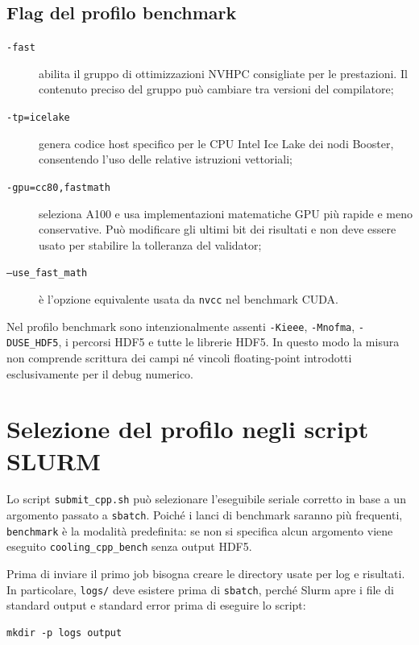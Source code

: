 \documentclass[11pt,a4paper]{article}
\begin{document}
\subsection{Flag del profilo benchmark}

\begin{description}
  \item[\texttt{-fast}] abilita il gruppo di ottimizzazioni NVHPC consigliate
  per le prestazioni. Il contenuto preciso del gruppo può cambiare tra versioni
  del compilatore;
  \item[\texttt{-tp=icelake}] genera codice host specifico per le CPU Intel Ice
  Lake dei nodi Booster, consentendo l'uso delle relative istruzioni vettoriali;
  \item[\texttt{-gpu=cc80,fastmath}] seleziona A100 e usa implementazioni
  matematiche GPU più rapide e meno conservative. Può modificare gli ultimi bit
  dei risultati e non deve essere usato per stabilire la tolleranza del
  validator;
  \item[\texttt{--use\_fast\_math}] è l'opzione equivalente usata da
  \texttt{nvcc} nel benchmark CUDA.
\end{description}

Nel profilo benchmark sono intenzionalmente assenti \texttt{-Kieee},
\texttt{-Mnofma}, \texttt{-DUSE\_HDF5}, i percorsi HDF5 e tutte le librerie
HDF5. In questo modo la misura non comprende scrittura dei campi né vincoli
floating-point introdotti esclusivamente per il debug numerico.


\section{Selezione del profilo negli script SLURM}

Lo script \texttt{submit\_cpp.sh} può selezionare l'eseguibile seriale corretto
in base a un argomento passato a \texttt{sbatch}. Poiché i lanci di benchmark
saranno più frequenti, \texttt{benchmark} è la modalità predefinita: se non si
specifica alcun argomento viene eseguito \texttt{cooling\_cpp\_bench} senza
output HDF5.

Prima di inviare il primo job bisogna creare le directory usate per log e
risultati. In particolare, \texttt{logs/} deve esistere prima di
\texttt{sbatch}, perché Slurm apre i file di standard output e standard error
prima di eseguire lo script:

\begin{lstlisting}[style=shell]
mkdir -p logs output
\end{lstlisting}
\end{document}
